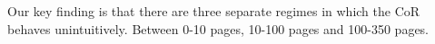\documentclass[preview]{standalone}
\begin{document}
\begin{center}
Our key finding is that there are three separate regimes in which the CoR behaves unintuitively. Between 0-10 pages, 10-100 pages and 100-350 pages.
\end{center}
\end{document}
